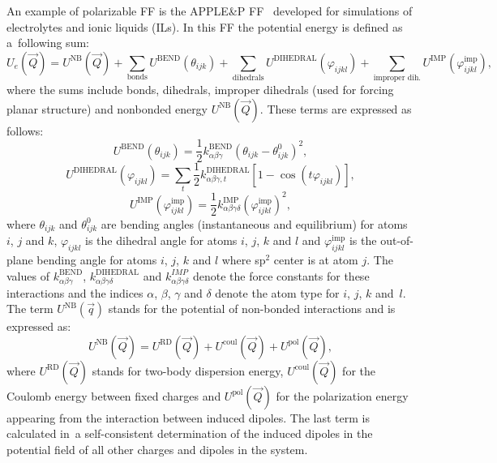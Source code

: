 An example of polarizable FF is the APPLE\&P FF~\cite{ff-applep,borodin-old-1,borodin-old-2} developed for simulations of electrolytes and ionic liquids (ILs). In this FF the potential energy is defined as a~following sum:
\begin{equation}
    U_e(\vec{Q}) = U^{\text{NB}} (\vec{Q}) + \sum_{\text{bonds}} U^{\text{BEND}}(\theta_{ijk}) + \sum_{\text{dihedrals}} U^{\text{DIHEDRAL}}(\varphi_{ijkl}) + \sum_{\text{improper dih.}} U^{\text{IMP}}(\varphi_{ijkl}^{\text{imp}}),
\end{equation}
where the sums include bonds, dihedrals, improper dihedrals (used for forcing planar structure) and nonbonded energy $U^{\text{NB}}(\vec{Q})$. These terms are expressed as follows:
\begin{equation}
    U^{\text{BEND}}(\theta_{ijk}) = \frac{1}{2} k^{\text{BEND}}_{\alpha \beta \gamma} \left( \theta_{ijk} - \theta_{ijk}^{0} \right)^2,
\end{equation}
\begin{equation}
    U^{\text{DIHEDRAL}}(\varphi_{ijkl}) = \sum_t \frac{1}{2} k^{\text{DIHEDRAL}}_{\alpha \beta \gamma, t} \left[1 - \cos{\left(t\varphi_{ijkl}\right)}\right],
\end{equation}
\begin{equation}
    U^{\text{IMP}}(\varphi^{\text{imp}}_{ijkl}) = \frac{1}{2} k^{\text{IMP}}_{\alpha \beta \gamma \delta}(\varphi^{\text{imp}}_{ijkl})^2,
\end{equation}
where $\theta_{ijk}$ and $\theta^{0}_{ijk}$ are bending angles (instantaneous and equilibrium) for atoms $i$, $j$ and $k$, $\varphi_{ijkl}$ is the dihedral angle for atoms $i$, $j$, $k$ and $l$ and $\varphi^{\text{imp}}_{ijkl}$ is the out-of-plane bending angle for atoms $i$, $j$, $k$ and $l$ where sp$^2$ center is at atom $j$. The values of $k_{\alpha \beta \gamma}^{\text{BEND}}$, $k_{\alpha \beta \gamma \delta}^{\text{DIHEDRAL}}$ and $k_{\alpha \beta \gamma \delta}^{IMP}$ denote the force constants for these interactions and the indices $\alpha$, $\beta$, $\gamma$ and $\delta$ denote the atom type for $i$, $j$, $k$ and~$l$. The term $U^{\text{NB}}(\vec{q})$ stands for the potential of non-bonded interactions and is expressed as:
\begin{equation}
    U^{\text{NB}}(\vec{Q}) = U^{\text{RD}}(\vec{Q}) + U^{\text{coul}}(\vec{Q}) + U^{\text{pol}}(\vec{Q}),
\end{equation}
where $U^{\text{RD}}(\vec{Q})$ stands for two-body dispersion energy, $U^{\text{coul}}(\vec{Q})$ for the Coulomb energy between fixed charges and $U^{\text{pol}}(\vec{Q})$ for the polarization energy appearing from the interaction between induced dipoles. The last term is calculated in~a self-consistent determination of the induced dipoles in the potential field of all other charges and dipoles in the system.

